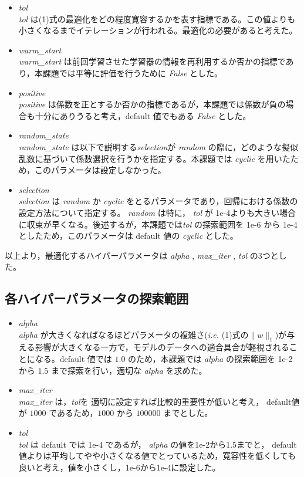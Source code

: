 \documentclass[a4j,11pt]{jarticle}
\begin{document}
\begin{itemize}
\item \textit{tol}\\
 \textit{tol} は(1)式の最適化をどの程度寛容するかを表す指標である。この値よりも小さくなるまでイテレーションが行われる。最適化の必要があると考えた。
\item \textit{warm\_start}\\
 \textit{warm\_start} は前回学習させた学習器の情報を再利用するか否かの指標であり，本課題では平等に評価を行うために \textit{False} とした。
\item \textit{positive}\\
 \textit{positive} は係数を正とするか否かの指標であるが，本課題では係数が負の場合も十分にありうると考え，default 値でもある \textit{False} とした。
\item \textit{random\_state}\\
 \textit{random\_state} は以下で説明する\textit{selection}が \textit{random} の際に，どのような擬似乱数に基づいて係数選択を行うかを指定する。本課題では \textit{cyclic} を用いたため，このパラメータは設定しなかった。
\item \textit{selection}\\
 \textit{selection} は \textit{random} か \textit{cyclic} をとるパラメータであり，回帰における係数の設定方法について指定する。 \textit{random} は特に， \textit{tol} が 1e-4よりも大きい場合に収束が早くなる。後述するが，本課題では\textit{tol} の探索範囲を 1e-6 から 1e-4 としたため，このパラメータは default 値の \textit{cyclic} とした。
\end{itemize}

以上より，最適化するハイパーパラメータは \textit{alpha} , \textit{max\_iter} , \textit{tol} の3つとした。

\subsection{各ハイパーパラメータの探索範囲}

\begin{itemize}
\item \textit{alpha}\\
 \textit{alpha} が大きくなればなるほどパラメータの複雑さ(\textit{i.e.} (1)式の$\|w\|_1$)が与える影響が大きくなる一方で，モデルのデータへの適合具合が軽視されることになる。default 値では $1.0$ のため，本課題では \textit{alpha} の探索範囲を 1e-2 から $1.5$ まで探索を行い，適切な \textit{alpha} を求めた。\\
\item \textit{max\_iter}\\
 \textit{max\_iter} は，\textit{tol}を 適切に設定すれば比較的重要性が低いと考え， default値が $1000$ であるため，$1000$ から $100000$ までとした。
\item \textit{tol}\\
 \textit{tol} は default では 1e-4 であるが， \textit{alpha} の値を1e-2から$1.5$までと， default 値よりは平均してやや小さくなる値でとっているため，寛容性を低くしても良いと考え，値を小さくし，1e-6から1e-4に設定した。
\end{itemize}
\end{document}
